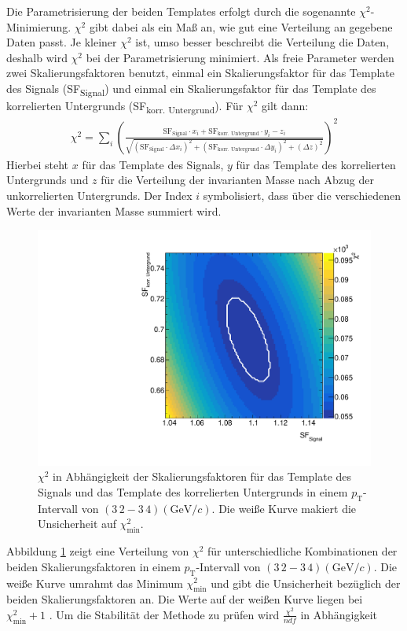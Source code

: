 Die Parametrisierung der beiden Templates erfolgt durch die sogenannte $\chi^{2}$-Minimierung.
$\chi^{2}$ gibt dabei als ein Maß an, wie gut eine Verteilung an gegebene Daten passt.
Je kleiner $\chi^{2}$ ist, umso besser beschreibt die Verteilung die Daten, deshalb wird $\chi^{2}$ bei der Parametrisierung minimiert.
Als freie Parameter werden zwei Skalierungsfaktoren benutzt, einmal ein Skalierungsfaktor für das Template des Signals (SF\textsubscript{Signal}) und einmal ein Skalierungsfaktor für das Template des korrelierten Untergrunds (SF\textsubscript{korr. Untergrund}).
Für $\chi^{2}$ gilt dann:
\begin{align}
\chi^{2} = \sum_{i}\left(\frac{\text{SF}_\text{Signal}\cdot x_{i}+\text{SF}_\text{korr. Untergrund}\cdot y_{i}-z_{i}}{\sqrt{\left(\text{SF}_\text{Signal}\cdot\Delta x_{i}\right)^{2}+\left(\text{SF}_\text{korr. Untergrund}\cdot\Delta y_{i}\right)^{2}+\left(\Delta z\right)^{2}}}\right)^{2}
\label{eq:Chi2}
\end{align}
Hierbei steht $x$ für das Template des Signals, $y$ für das Template des korrelierten Untergrunds und $z$ für die Verteilung der invarianten Masse nach Abzug der unkorrelierten Untergrunds.
Der Index $i$  symbolisiert, dass über die verschiedenen Werte der invarianten Masse summiert wird.
\begin{figure}[tp]
\centering
\includegraphics[width=.65\linewidth]{Chi2Map10_Data_2016.pdf}
\caption{$\chi^{2}$ in Abhängigkeit der Skalierungsfaktoren für das Template des Signals und das Template des korrelierten Untergrunds in einem $p_{\text{T}}$-Intervall von $(3\,2 - 3\,4)(\text{GeV}/c)$.
Die weiße Kurve makiert die Unsicherheit auf $\chi^{2}_\text{min}$.}
\label{fig:Chi2Map}
\end{figure}
\newline
Abbildung \ref{fig:Chi2Map} zeigt eine Verteilung von $\chi^{2}$ für unterschiedliche Kombinationen der beiden Skalierungsfaktoren in einem $p_{\text{T}}$-Intervall von $(3\,2 - 3\,4)(\text{GeV}/c)$.
Die weiße Kurve umrahmt das Minimum $\chi^{2}_\text{min}$ und gibt die Unsicherheit bezüglich der beiden Skalierungsfaktoren an.
Die Werte auf der weißen Kurve liegen bei $\chi^{2}_\text{min}+1$ \cite{book:chi2}.
\newline
Um die Stabilität der Methode zu prüfen wird $\frac{\chi^{2}}{ndf}$ in Abhängigkeit 
